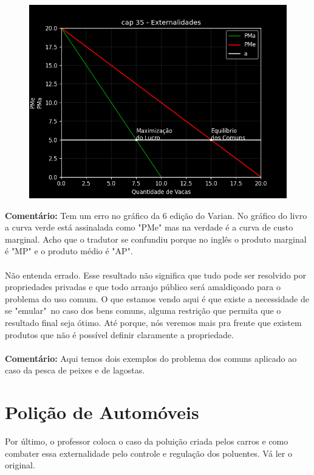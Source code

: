 \documentclass[a4paper,11pt,oneside]{book}
\theoremstyle{definition}
\theoremstyle{break}
\begin{document}
\begin{figure}[H]
	\centering
	\includegraphics[scale=0.7]{cap35_6-tragedia_comum.png}
\end{figure}

\textbf{Comentário:} Tem um erro no gráfico da 6 edição do Varian. No gráfico do livro a curva verde está assinalada como "PMe" mas na verdade é a curva de custo marginal. Acho que o tradutor se confundiu porque no inglês o produto marginal é "MP" e o produto médio é "AP".
\\~\\
Não entenda errado. Esse resultado não significa que tudo pode ser resolvido por propriedades privadas e que todo arranjo público será amaldiçoado para o problema do uso comum. O que estamos vendo aqui é que existe a necessidade de se "emular"\ no caso dos bens comuns, alguma restrição que permita que o resultado final seja ótimo. Até porque, nós veremos mais pra frente que existem produtos que não é possível definir claramente a propriedade.
\\~\\
\textbf{Comentário: } Aqui temos dois exemplos do problema dos comuns aplicado ao caso da pesca de peixes e de lagostas.

\section{Polição de Automóveis}

Por último, o professor coloca o caso da poluição criada pelos carros e como combater essa externalidade pelo controle e regulação dos poluentes. Vá ler o original.
\end{document}
